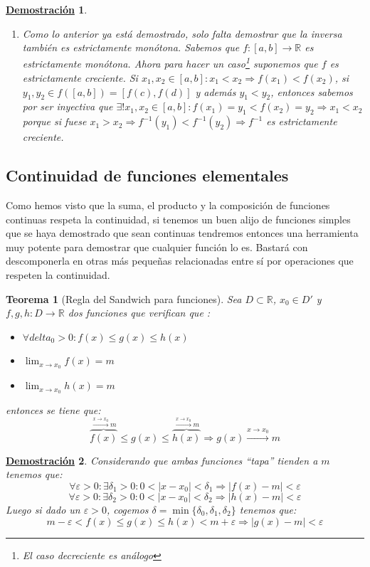 \documentclass[10pt,a4paper,openright]{book}
\theoremstyle{break}
\newtheorem{theo}{Teorema}[chapter]
\newtheorem*{demo}{\underline{Demostración}}
\begin{document}
\begin{demo}
\begin{enumerate}
\item Como lo anterior ya está demostrado, solo falta demostrar que la inversa también es estrictamente monótona. Sabemos que $f: [a,b]\rightarrow \mathbb R$ es estrictamente monótona. Ahora para hacer un caso\footnote{El caso decreciente es análogo} suponemos que $f$ es estrictamente creciente. Si $x_1,x_2\in [a,b]: x_1<x_2\Rightarrow f(x_1)<f(x_2)$, si $y_1,y_2\in f([a,b])=[f(c), f(d)]$ y además $y_1<y_2$, entonces sabemos por ser inyectiva que $\exists! x_1, x_2\in [a,b]: f(x_1)=y_1 < f(x_2)=y_2\Rightarrow x_1< x_2$ porque si fuese $x_1>x_2\Rightarrow f^{-1}(y_1)<f^{-1}(y_2)\Rightarrow f^{-1}$ es estrictamente creciente.
\end{enumerate} 
\end{demo}

\subsection{Continuidad de funciones elementales}
Como hemos visto que la suma, el producto y la composición de funciones continuas respeta la continuidad, si tenemos un buen alijo de funciones simples que se haya demostrado que sean continuas tendremos entonces una herramienta muy potente para demostrar que cualquier función lo es. Bastará con descomponerla en otras más pequeñas relacionadas entre sí por operaciones que respeten la continuidad.

\begin{theo}[Regla del Sandwich para funciones]
Sea $D\subset \mathbb R$, $x_0\in D'$ y $f,g,h: D\rightarrow\mathbb R$ dos funciones que verifican que :
\begin{itemize}
\item $\forall delta_0>0 : f(x)\leq g(x)\leq h(x)$
\item $\lim_{x\rightarrow x_0} f(x)=m$
\item $\lim_{x\rightarrow x_0} h(x) = m$
\end{itemize}
entonces se tiene que:
$$\overbrace{f(x)}^{\xrightarrow{x\rightarrow x_0} m} \leq g(x)\leq \overbrace{h(x)}^{\xrightarrow{x\rightarrow x_0}m}\Rightarrow g(x)\xrightarrow{x\rightarrow x_0}m$$
\end{theo}
\begin{demo}
Considerando que ambas funciones ``tapa'' tienden a $m$ tenemos que:
$$\forall \varepsilon>0 : \exists \delta_1>0 : 0<|x-x_0|<\delta_1\Rightarrow |f(x)-m|<\varepsilon$$
$$\forall \varepsilon>0: \exists \delta_2>0: 0<|x-x_0|<\delta_2\Rightarrow |h(x)-m|<\varepsilon$$
Luego si dado un $\varepsilon>0$, cogemos $\delta=\min\{\delta_0, \delta_1,\delta_2\}$ tenemos que:
$$m-\varepsilon< f(x) \leq g(x) \leq h(x) < m+\varepsilon\Rightarrow |g(x)-m|<\varepsilon$$
\end{demo}
\end{document}
